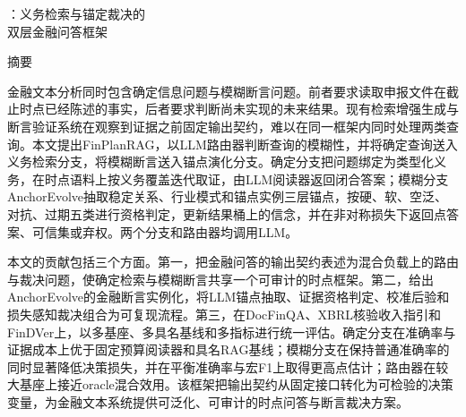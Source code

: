 \clearpage
{}
{}
\begin{center}
{\heiti \method：义务检索与锚定裁决的\\[0.2cm]
双层金融问答框架\par}
\vspace{0.6cm}
{\heiti 摘\quad 要\par}
\end{center}
\vspace{0.4cm}
{\songti\sloppy
\setlength{\parindent}{0pt}
\setlength{\emergencystretch}{2em}
\hspace*{2em}金融文本分析同时包含确定信息问题与模糊断言问题。前者要求读取申报文件在截止时点已经陈述的事实，后者要求判断尚未实现的未来结果。现有检索增强生成与断言验证系统在观察到证据之前固定输出契约，难以在同一框架内同时处理两类查询。本文提出FinPlanRAG，以LLM路由器判断查询的模糊性，并将确定查询送入义务检索分支，将模糊断言送入锚点演化分支。确定分支把问题绑定为类型化义务，在时点语料上按义务覆盖迭代取证，由LLM阅读器返回闭合答案；模糊分支AnchorEvolve抽取稳定关系、行业模式和锚点实例三层锚点，按硬、软、空泛、对抗、过期五类进行资格判定，更新结果桶上的信念，并在非对称损失下返回点答案、可信集或弃权。两个分支和路由器均调用LLM。\par
\hspace*{2em}本文的贡献包括三个方面。第一，把金融问答的输出契约表述为混合负载上的路由与裁决问题，使确定检索与模糊断言共享一个可审计的时点框架。第二，给出AnchorEvolve的金融断言实例化，将LLM锚点抽取、证据资格判定、校准后验和损失感知裁决组合为可复现流程。第三，在DocFinQA、XBRL核验收入指引和FinDVer上，以多基座、多具名基线和多指标进行统一评估。确定分支在准确率与证据成本上优于固定预算阅读器和具名RAG基线；模糊分支在保持普通准确率的同时显著降低决策损失，并在平衡准确率与宏F1上取得更高点估计；路由器在较大基座上接近oracle混合效用。该框架把输出契约从固定接口转化为可检验的决策变量，为金融文本系统提供可泛化、可审计的时点问答与断言裁决方案。\par
{}

}
